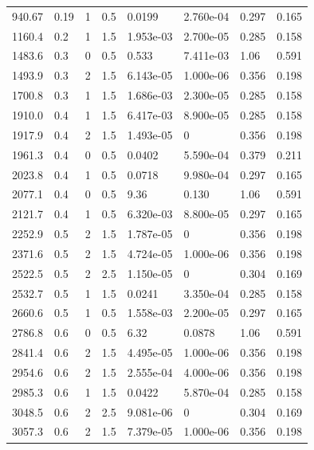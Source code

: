 \documentclass[preview]{standalone}
\begin{document}
{{\begin{tabular}{L{1.2cm}C{1.2cm} C{0.3cm}C{0.5cm} C{1.4cm}C{1.4cm} C{1.4cm}C{1.4cm}}
  940.67  &  0.19  & 1     & 0.5 &  0.0199  & 2.760e-04  & 0.297 &  0.165   \\ 
  1160.4  &   0.2  & 1     & 1.5 &  1.953e-03  & 2.700e-05  & 0.285 &  0.158   \\ 
  1483.6  &   0.3  & 0     & 0.5 &  0.533  & 7.411e-03  & 1.06 &  0.591   \\ 
  1493.9  &   0.3  & 2     & 1.5 &  6.143e-05  & 1.000e-06  & 0.356 &  0.198   \\ 
  1700.8  &   0.3  & 1     & 1.5 &  1.686e-03  & 2.300e-05  & 0.285 &  0.158   \\ 
  1910.0  &   0.4  & 1     & 1.5 &  6.417e-03  & 8.900e-05  & 0.285 &  0.158   \\ 
  1917.9  &   0.4  & 2     & 1.5 &  1.493e-05  & 0  & 0.356 &  0.198   \\ 
  1961.3  &   0.4  & 0     & 0.5 &  0.0402  & 5.590e-04  & 0.379 &  0.211   \\ 
  2023.8  &   0.4  & 1     & 0.5 &  0.0718  & 9.980e-04  & 0.297 &  0.165   \\ 
  2077.1  &   0.4  & 0     & 0.5 &  9.36  & 0.130  & 1.06 &  0.591   \\ 
  2121.7  &   0.4  & 1     & 0.5 &  6.320e-03  & 8.800e-05  & 0.297 &  0.165   \\ 
  2252.9  &   0.5  & 2     & 1.5 &  1.787e-05  & 0  & 0.356 &  0.198   \\ 
  2371.6  &   0.5  & 2     & 1.5 &  4.724e-05  & 1.000e-06  & 0.356 &  0.198   \\ 
  2522.5  &   0.5  & 2     & 2.5 &  1.150e-05  & 0  & 0.304 &  0.169   \\ 
  2532.7  &   0.5  & 1     & 1.5 &  0.0241  & 3.350e-04  & 0.285 &  0.158   \\ 
  2660.6  &   0.5  & 1     & 0.5 &  1.558e-03  & 2.200e-05  & 0.297 &  0.165   \\ 
  2786.8  &   0.6  & 0     & 0.5 &  6.32  & 0.0878  & 1.06 &  0.591   \\ 
  2841.4  &   0.6  & 2     & 1.5 &  4.495e-05  & 1.000e-06  & 0.356 &  0.198   \\ 
  2954.6  &   0.6  & 2     & 1.5 &  2.555e-04  & 4.000e-06  & 0.356 &  0.198   \\ 
  2985.3  &   0.6  & 1     & 1.5 &  0.0422  & 5.870e-04  & 0.285 &  0.158   \\ 
  3048.5  &   0.6  & 2     & 2.5 &  9.081e-06  & 0  & 0.304 &  0.169   \\ 
  3057.3  &   0.6  & 2     & 1.5 &  7.379e-05  & 1.000e-06  & 0.356 &  0.198   \\ 

\end{tabular}}}
\end{document}
